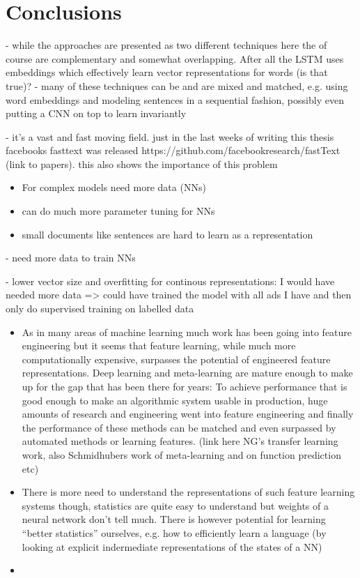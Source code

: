 
\clearpage

\section{Conclusions}
\label{sec:Conclusions}


- while the approaches are presented as two different techniques here the of course are complementary and somewhat overlapping. After all the LSTM uses embeddings which effectively learn vector representations for words (is that true)?
- many of these techniques can be and are mixed and matched, e.g. using word embeddings and modeling sentences in a sequential fashion, possibly even putting a CNN on top to learn invariantly

- it's a vast and fast moving field. just in the last weeks of writing this thesis facebooks fasttext was released https://github.com/facebookresearch/fastText (link to papers). this also shows the importance of this problem

\begin{itemize}
  \item For complex models need more data (NNs)
  \item can do much more parameter tuning for NNs
  \item small documents like sentences are hard to learn as a representation
\end{itemize}

- need more data to train NNs



- lower vector size and overfitting for continous representations: I would have needed more data => could have trained the model with all ads I have and then only do supervised training on labelled data

\begin{itemize}
  \item As in many areas of machine learning much work has been going into feature engineering but it seems that feature learning, while much more computationally expensive, surpasses the potential of engineered feature representations. Deep learning and meta-learning are mature enough to make up for the gap that has been there for years: To achieve performance that is good enough to make an algorithmic system usable in production, huge amounts of research and engineering went into feature engineering and finally the performance of these methods can be matched and even surpassed by automated methods or learning features. (link here NG's transfer learning work, also Schmidhubers work of meta-learning and on function prediction etc)
  \item There is more need to understand the representations of such feature learning systems though, statistics are quite easy to understand but weights of a neural network don't tell much. There is however potential for learning ``better statistics'' ourselves, e.g. how to efficiently learn a language (by looking at explicit indermediate representations of the states of a NN)
  \item
\end{itemize}


